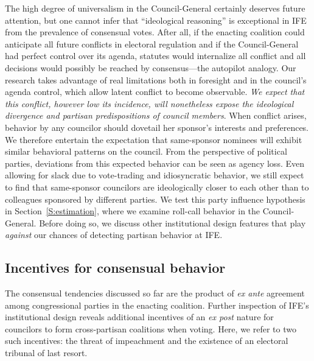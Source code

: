 \documentclass[12 pt, letter]{article}
\begin{document}
The high degree of universalism in the Council-General certainly
deserves future attention, but one cannot infer that ``ideological
reasoning'' is exceptional in IFE from the prevalence of consensual
votes. After all, if the enacting coalition could anticipate all
future conflicts in electoral regulation and if the Council-General
had perfect control over its agenda, statutes would internalize all
conflict and all decisions would possibly be reached by
consensus---the autopilot analogy. Our research takes advantage of
real limitations both in foresight and in the council's agenda
control, which allow latent conflict to become observable. \emph{We
expect that this conflict, however low its incidence, will
nonetheless expose the ideological divergence and partisan
predispositions of council members}.  When conflict arises, behavior
by any councilor should dovetail her sponsor's interests and
preferences. We therefore entertain the expectation that
same-sponsor nominees will exhibit similar behavioral patterns on
the council. From the perspective of political parties, deviations
from this expected behavior can be seen as agency loss. Even
allowing for slack due to vote-trading and idiosyncratic behavior,
we still expect to find that same-sponsor councilors are
ideologically closer to each other than to colleagues sponsored by
different parties.  We test this party influence hypothesis in
Section~\ref{S:estimation}, where we examine roll-call behavior in
the Council-General.  Before doing so, we discuss other
institutional design features that play \emph{against} our chances
of detecting partisan behavior at IFE.

\subsection{Incentives for consensual behavior}
The consensual tendencies discussed so far are the product of
\emph{ex ante} agreement among congressional parties in the enacting
coalition.  Further inspection of IFE's institutional design reveals
additional incentives of an \emph{ex post} nature for councilors to
form cross-partisan coalitions when voting.  Here, we refer to two
such incentives: the threat of impeachment and the existence of an
electoral tribunal of last resort.
\end{document}
